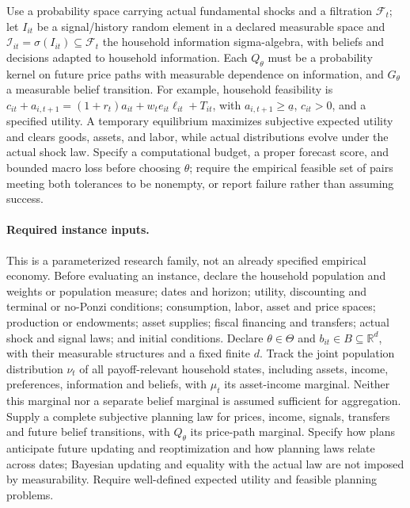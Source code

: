 \documentclass[11pt,a4paper]{article}
\newcommand{\R}{\mathbb R}
\begin{document}
Use a probability space carrying actual fundamental shocks and a filtration \(\mathcal F_t\); let \(I_{it}\) be a signal/history random element in a declared measurable space and \(\mathcal I_{it}=\sigma(I_{it})\subseteq\mathcal F_t\) the household information sigma-algebra, with beliefs and decisions adapted to household information. Each \(Q_\theta\) must be a probability kernel on future price paths with measurable dependence on information, and \(G_\theta\) a measurable belief transition. For example, household feasibility is \(c_{it}+a_{i,t+1}=(1+r_t)a_{it}+w_te_{it}\ell_{it}+T_{it}\), with \(a_{i,t+1}\ge\underline a\), \(c_{it}>0\), and a specified utility. A temporary equilibrium maximizes subjective expected utility and clears goods, assets, and labor, while actual distributions evolve under the actual shock law. Specify a computational budget, a proper forecast score, and bounded macro loss before choosing \(\theta\); require the empirical feasible set of pairs meeting both tolerances to be nonempty, or report failure rather than assuming success.

\paragraph{Required instance inputs.} This is a parameterized research family, not an already specified empirical economy. Before evaluating an instance, declare the household population and weights or population measure; dates and horizon; utility, discounting and terminal or no-Ponzi conditions; consumption, labor, asset and price spaces; production or endowments; asset supplies; fiscal financing and transfers; actual shock and signal laws; and initial conditions. Declare \(\theta\in\Theta\) and \(b_{it}\in B\subseteq\R^d\), with their measurable structures and a fixed finite \(d\). Track the joint population distribution \(\nu_t\) of all payoff-relevant household states, including assets, income, preferences, information and beliefs, with \(\mu_t\) its asset-income marginal. Neither this marginal nor a separate belief marginal is assumed sufficient for aggregation. Supply a complete subjective planning law for prices, income, signals, transfers and future belief transitions, with \(Q_\theta\) its price-path marginal. Specify how plans anticipate future updating and reoptimization and how planning laws relate across dates; Bayesian updating and equality with the actual law are not imposed by measurability. Require well-defined expected utility and feasible planning problems.
\end{document}
